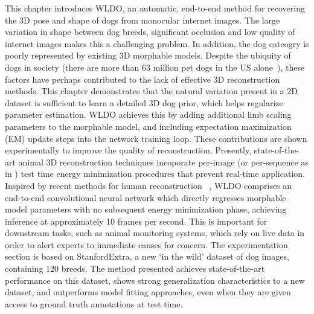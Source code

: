 This chapter introduces WLDO, an automatic, end-to-end method for recovering the 3D pose and shape of dogs from monocular internet images. The large variation in shape between dog breeds, significant occlusion and low quality of internet images makes this a challenging problem. In addition, the dog cateogry is poorly represented by existing 3D morphable models. Despite the ubiquity of dogs in society (there are more than 63 million pet dogs in the US alone~\cite{appa20}), these factors have perhaps contributed to the lack of effective 3D reconstruction methods. 
This chapter demonstrates that the natural variation present in a 2D dataset is sufficient to learn a detailed 3D dog prior, which helps regularize parameter estimation. WLDO achieves this by adding additional limb scaling parameters to the morphable model, and including expectation maximization (EM) update steps into the network training loop. These contributions are shown experimentally to improve the quality of reconstruction. 
Presently, state-of-the-art animal 3D reconstruction techniques incoporate per-image (or per-sequence as in ) test time energy minimization procedures that prevent real-time application. Inspired by recent methods for human reconstruction ~\cite{kanazawa18end-to-end}, WLDO comprises an end-to-end convolutional neural network which directly regresses morphable model parameters with no subsequent energy minimization phase, achieving inference at approximately 10 frames per second. This is important for downstream tasks, such as animal monitoring systems, which rely on live data in order to alert experts to immediate causes for concern. 
The experimentation section is based on StanfordExtra, a new `in the wild' dataset of dog images, containing 120 breeds. The method presented achieves state-of-the-art performance on this dataset, shows strong generalization characteristics to a new dataset, and outperforms model fitting approaches, even when they are given access to ground truth annotations at test time. 



